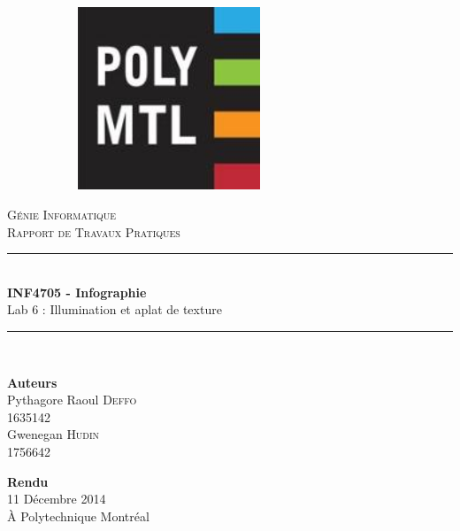 \documentclass[10pt,a4paper]{article}
\newcommand{\HRule}{\rule{\linewidth}{0.5mm}}
\begin{document}
\begin{titlepage}
	\begin{center}
		\begin{figure}
        \begin{subfigure}[c]{0.2\textwidth}
        		\centering
                \includegraphics[width=0.6\textwidth]{images/logo-polymtl}
        \end{subfigure}
		\end{figure}
		
		
		\vspace{30pt}
		\textsc{\huge Génie Informatique}\\
		\textsc{\LARGE Rapport de Travaux Pratiques}\\		
		\vfill
		
		\HRule \\[0.7cm]
		{\Huge \bfseries INF4705 - Infographie}\\[0.4cm]
		{\Large Lab 6 : Illumination et aplat de texture}\\[0.2cm]
		\HRule\\[1cm]
		
		\vfill
		
		\begin{minipage}{0.49\textwidth}
			\begin{flushleft} \LARGE
				\textbf{Auteurs}\\
				Pythagore Raoul \textsc{Deffo}\\ 1635142\\
				Gwenegan \textsc{Hudin}\\ 1756642\\[0.5cm]
			\end{flushleft}
		\end{minipage}
		\begin{minipage}{0.49\textwidth}
			\begin{flushright} \LARGE
				\textbf{Rendu}\\
				11 Décembre 2014\\ À Polytechnique Montréal\\[0.5cm]
			\end{flushright}
		\end{minipage}
	\end{center}
\end{titlepage}
\end{document}
